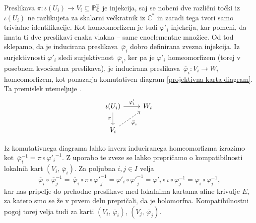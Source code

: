 \documentclass[mat1]{fmfdelo}
\numberwithin{equation}{section}
\newcommand{\C}{\mathbb C}
\newcommand{\CM}{\mathbb C ^*}
\newcommand{\PC}{\mathbb{P}^2_\C}
\newcommand{\inv}{^{-1}}
\newcommand{\olsi}[1]{\,\overline{\!{#1}}} %
\theoremstyle{definition}
\begin{document}
Preslikava $\pi: \iota(U_i) \to V_i \subseteq \PC$ je injekcija, saj se nobeni dve različni točki iz $\iota(U_i)$ ne razlikujeta za skalarni večkratnik iz $\CM$ in zaradi tega tvori samo trivialne identifikacije. Kot homeomorfizem je tudi $\varphi'_i$ injekcija, kar pomeni, da imata ti dve preslikavi enaka vlakna -- same enoelementne množice. Od tod sklepamo, da je inducirana preslikava $\olsi{\varphi}_i$ dobro definirana zvezna injekcija. Iz surjektivnosti $\varphi'_i$ sledi surjektivnost $\olsi{\varphi}_i$, ker pa je $\varphi'_i$ homeomorfizem (torej v posebnem kvocientna preslikava), je inducirana preslikava $\olsi{\varphi}_i : V_i \to W_i$ homeomorfizem, kot ponazarja komutativen diagram \eqref{projektivna karta diagram}. Ta premislek utemeljuje \cite[posledica 3.23]{MrcunTop}.
%
%
\begin{equation}
    \label{projektivna karta diagram}    
    \begin{tikzcd}
	{\iota(U_i)} & {W_i} \\
	{V_i}
	\arrow["{\varphi'_i}", from=1-1, to=1-2]
	\arrow["\pi"', from=1-1, to=2-1]
	\arrow["{\olsi{\varphi}_i}"', dashed, from=2-1, to=1-2]
    \end{tikzcd}
\end{equation}


Iz komutativnega diagrama lahko inverz induciranega homeomorfizma izrazimo kot $\olsi{\varphi}_i\inv = \pi \circ {\varphi'_i}\inv$. Z uporabo te zveze se lahko prepričamo o kompatibilnosti lokalnih kart
$(V_i, \olsi{\varphi}_i)$.
Za poljubna $i,j \in I$ velja
\[
    \olsi{\varphi}_i \circ \olsi{\varphi}_j\inv = 
    \olsi{\varphi}_i \circ \pi \circ {\varphi'}_j\inv = 
    \varphi'_i \circ {\varphi'}_j\inv = 
    \varphi'_i \circ \iota \circ \varphi_j\inv = 
    \varphi_i \circ \varphi_j\inv,
\]
kar nas pripelje do prehodne preslikave med lokalnima kartama afine krivulje $E$, za katero smo se že v prvem delu prepričali, da je holomorfna. Kompatibilnostni pogoj torej velja tudi za karti $(V_i, \olsi{\varphi}_i)$, $(V_j, \olsi{\varphi}_j)$.
\end{document}
